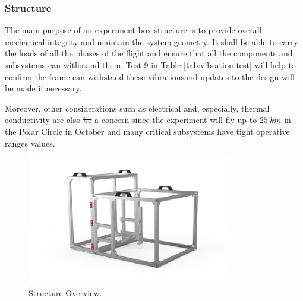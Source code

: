 \documentclass[a4paper,12pt,oneside]{article} %
\providecommand{\DIFaddtex}[1]{{\protect\color{blue}\uwave{#1}}} %
\providecommand{\DIFdeltex}[1]{{\protect\color{red}\sout{#1}}}                      %
\providecommand{\DIFaddbegin}{} %
\providecommand{\DIFaddend}{} %
\providecommand{\DIFdelbegin}{} %
\providecommand{\DIFdelend}{} %
\providecommand{\DIFaddbeginFL}{} %
\providecommand{\DIFaddendFL}{} %
\providecommand{\DIFdelbeginFL}{} %
\providecommand{\DIFdelendFL}{} %
\providecommand{\DIFadd}[1]{\texorpdfstring{\DIFaddtex{#1}}{#1}} %
\providecommand{\DIFdel}[1]{\texorpdfstring{\DIFdeltex{#1}}{}} %
\newcommand{\DIFscaledelfig}{0.5}
\newlength{\DIFdelgraphicswidth} %
\newlength{\DIFdelgraphicsheight} %
\newcommand{\DIFaddincludegraphics}[2][]{{\color{blue}\fbox{\DIFOincludegraphics[#1]{#2}}}} %
\newcommand{\DIFdelincludegraphics}[2][]{%
\sbox{\DIFdelgraphicsbox}{\DIFOincludegraphics[#1]{#2}}%
\settoboxwidth{\DIFdelgraphicswidth}{\DIFdelgraphicsbox} %
\settoboxtotalheight{\DIFdelgraphicsheight}{\DIFdelgraphicsbox} %
\scalebox{\DIFscaledelfig}{%
\parbox[b]{\DIFdelgraphicswidth}{\usebox{\DIFdelgraphicsbox}\\[-\baselineskip] \rule{\DIFdelgraphicswidth}{0em}}\llap{\resizebox{\DIFdelgraphicswidth}{\DIFdelgraphicsheight}{%
\setlength{\unitlength}{\DIFdelgraphicswidth}%
\begin{picture}(1,1)%
\thicklines\linethickness{2pt} %
{\color[rgb]{1,0,0}\put(0,0){\framebox(1,1){}}}%
{\color[rgb]{1,0,0}\put(0,0){\line( 1,1){1}}}%
{\color[rgb]{1,0,0}\put(0,1){\line(1,-1){1}}}%
\end{picture}%
}\hspace*{3pt}}} %
} %
\DeclareRobustCommand{\DIFaddbegin}{\DIFOaddbegin \let\includegraphics\DIFaddincludegraphics} %
\DeclareRobustCommand{\DIFaddend}{\DIFOaddend \let\includegraphics\DIFOincludegraphics} %
\DeclareRobustCommand{\DIFdelbegin}{\DIFOdelbegin \let\includegraphics\DIFdelincludegraphics} %
\DeclareRobustCommand{\DIFdelend}{\DIFOaddend \let\includegraphics\DIFOincludegraphics} %
\DeclareRobustCommand{\DIFaddbeginFL}{\DIFOaddbeginFL \let\includegraphics\DIFaddincludegraphics} %
\DeclareRobustCommand{\DIFaddendFL}{\DIFOaddendFL \let\includegraphics\DIFOincludegraphics} %
\DeclareRobustCommand{\DIFdelbeginFL}{\DIFOdelbeginFL \let\includegraphics\DIFdelincludegraphics} %
\DeclareRobustCommand{\DIFdelendFL}{\DIFOaddendFL \let\includegraphics\DIFOincludegraphics} %
\begin{document}
\pagebreak
\subsubsection{Structure}
\label{sec:4.4.1}

The main purpose of an experiment box structure is to provide overall mechanical integrity and maintain the system geometry. It \DIFdelbegin \DIFdel{shall be }\DIFdelend \DIFaddbegin \DIFadd{is }\DIFaddend able to carry the loads of all the phases of the flight and ensure that all the components and subsystems can withstand them. Test 9 in Table \ref{tab:vibration-test} \DIFdelbegin \DIFdel{will help }\DIFdelend \DIFaddbegin \DIFadd{helped }\DIFaddend to confirm the frame can withstand these vibrations\DIFdelbegin \DIFdel{and updates to the design will be made if necessary}\DIFdelend .

Moreover, other considerations such as electrical and, especially, thermal conductivity are also \DIFdelbegin \DIFdel{be }\DIFdelend a concern since the experiment will fly up to $25\ km$ in the Polar Circle in \DIFaddbegin \DIFadd{mid }\DIFaddend October and many critical subsystems have tight operative ranges values.

 \begin{figure}[H]
     \centering
     \DIFdelbeginFL %
\DIFdelendFL \DIFaddbeginFL \includegraphics[width=0.8\textwidth]{4-experiment-design/img/Mechanical/structure.png}
     \DIFaddendFL \caption{Structure Overview.}
     \label{fig:structure}
\end{figure}
\end{document}
